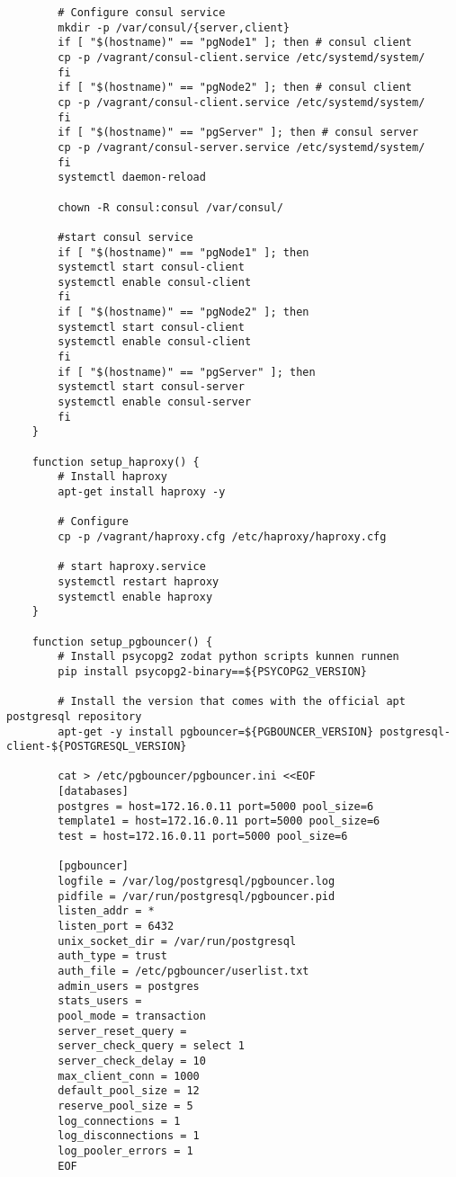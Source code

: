 \begin{lstlisting}
        # Configure consul service
        mkdir -p /var/consul/{server,client}
        if [ "$(hostname)" == "pgNode1" ]; then # consul client
        cp -p /vagrant/consul-client.service /etc/systemd/system/
        fi
        if [ "$(hostname)" == "pgNode2" ]; then # consul client
        cp -p /vagrant/consul-client.service /etc/systemd/system/
        fi
        if [ "$(hostname)" == "pgServer" ]; then # consul server
        cp -p /vagrant/consul-server.service /etc/systemd/system/
        fi
        systemctl daemon-reload
        
        chown -R consul:consul /var/consul/
        
        #start consul service
        if [ "$(hostname)" == "pgNode1" ]; then
        systemctl start consul-client
        systemctl enable consul-client
        fi
        if [ "$(hostname)" == "pgNode2" ]; then
        systemctl start consul-client
        systemctl enable consul-client
        fi
        if [ "$(hostname)" == "pgServer" ]; then
        systemctl start consul-server
        systemctl enable consul-server
        fi
    }
    
    function setup_haproxy() {
        # Install haproxy
        apt-get install haproxy -y
        
        # Configure
        cp -p /vagrant/haproxy.cfg /etc/haproxy/haproxy.cfg
        
        # start haproxy.service
        systemctl restart haproxy
        systemctl enable haproxy
    }
    
    function setup_pgbouncer() {
        # Install psycopg2 zodat python scripts kunnen runnen
        pip install psycopg2-binary==${PSYCOPG2_VERSION}
        
        # Install the version that comes with the official apt postgresql repository
        apt-get -y install pgbouncer=${PGBOUNCER_VERSION} postgresql-client-${POSTGRESQL_VERSION}
        
        cat > /etc/pgbouncer/pgbouncer.ini <<EOF
        [databases]
        postgres = host=172.16.0.11 port=5000 pool_size=6
        template1 = host=172.16.0.11 port=5000 pool_size=6
        test = host=172.16.0.11 port=5000 pool_size=6
        
        [pgbouncer]
        logfile = /var/log/postgresql/pgbouncer.log
        pidfile = /var/run/postgresql/pgbouncer.pid
        listen_addr = *
        listen_port = 6432
        unix_socket_dir = /var/run/postgresql
        auth_type = trust
        auth_file = /etc/pgbouncer/userlist.txt
        admin_users = postgres
        stats_users =
        pool_mode = transaction
        server_reset_query =
        server_check_query = select 1
        server_check_delay = 10
        max_client_conn = 1000
        default_pool_size = 12
        reserve_pool_size = 5
        log_connections = 1
        log_disconnections = 1
        log_pooler_errors = 1
        EOF
        

\end{lstlisting}
